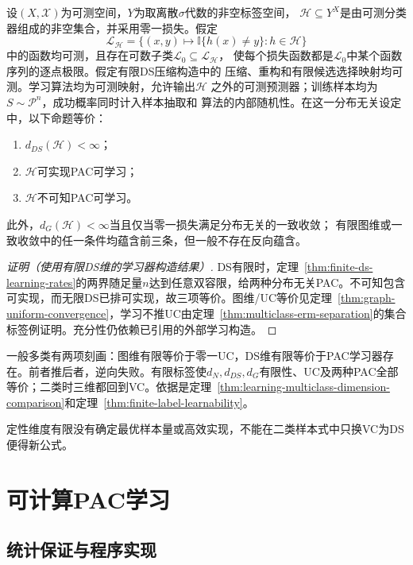 \begin{theorem}[多分类学习基本定理]
\label{thm:ds-characterization}
设$(X,\mathcal X)$为可测空间，$Y$为取离散$\sigma$代数的非空标签空间，
$\mathcal H\subseteq Y^X$是由可测分类器组成的非空集合，并采用零一损失。假定
\[
 \mathcal L_{\mathcal H}
 =\{(x,y)\mapsto\mathbb I\{h(x)\neq y\}:h\in\mathcal H\}
\]
中的函数均可测，且存在可数子类$\mathcal L_0\subseteq\mathcal L_{\mathcal H}$，
使每个损失函数都是$\mathcal L_0$中某个函数序列的逐点极限。假定有限DS压缩构造中的
压缩、重构和有限候选选择映射均可测。学习算法均为可测映射，允许输出$\mathcal H$
之外的可测预测器；训练样本均为$S\sim\mathcal P^n$，成功概率同时计入样本抽取和
算法的内部随机性。在这一分布无关设定中，以下命题等价：
\begin{enumerate}
 \item $d_{DS}(\mathcal H)<\infty$；
 \item $\mathcal H$可实现PAC可学习；
 \item $\mathcal H$不可知PAC可学习。
\end{enumerate}
此外，$d_G(\mathcal H)<\infty$当且仅当零一损失满足分布无关的一致收敛；
有限图维或一致收敛中的任一条件均蕴含前三条，但一般不存在反向蕴含。
\end{theorem}

\begin{proof}[证明（使用有限DS维的学习器构造结果）]
DS有限时，定理~\ref{thm:finite-ds-learning-rates}的两界随足量$n$达到任意双容限，给两种分布无关PAC。不可知包含可实现，而无限DS已排可实现，故三项等价。图维/UC等价见定理~\ref{thm:graph-uniform-convergence}，学习不推UC由定理~\ref{thm:multiclass-erm-separation}的集合标签例证明。充分性仍依赖已引用的外部学习构造。
\end{proof}

一般多类有两项刻画：图维有限等价于零一UC，DS维有限等价于PAC学习器存在。前者推后者，逆向失败。有限标签使$d_N,d_{DS},d_G$有限性、UC及两种PAC全部等价；二类时三维都回到VC。依据是定理~\ref{thm:learning-multiclass-dimension-comparison}和定理~\ref{thm:finite-label-learnability}。

定性维度有限没有确定最优样本量或高效实现，不能在二类样本式中只换VC为DS便得新公式。

\section{可计算PAC学习}
\label{sec:computable-multiclass-learning}

\subsection{统计保证与程序实现}

